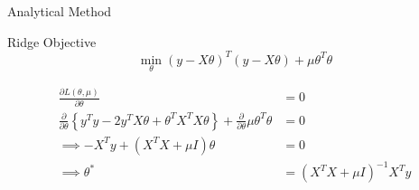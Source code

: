 \documentclass{beamer}
\begin{document}
\begin{frame}{Analytical Method}
\begin{tcolorbox}{Ridge Objective}
\vspace{-0.4cm}
$$
\min_\theta \left(y-X\theta\right)^T\left(y-X\theta\right)+ \mu\theta^T\theta
$$
\end{tcolorbox}
\begin{align*}
\frac{\partial L\left(\theta, \mu\right)}{\partial \theta} &= 0 \\ 
\frac{\partial}{\partial \theta}\left\lbrace y^Ty - 2y^TX\theta + \theta^TX^TX\theta \right\rbrace +  \frac{\partial}{\partial \theta} \mu\theta^T\theta &= 0 \\
\implies -X^Ty + \left(X^TX + \mu I\right)\theta &= 0 \\
\implies \theta^* &= \left(X^TX + \mu I\right)^{-1}X^Ty
\end{align*}
\end{frame}
\end{document}
